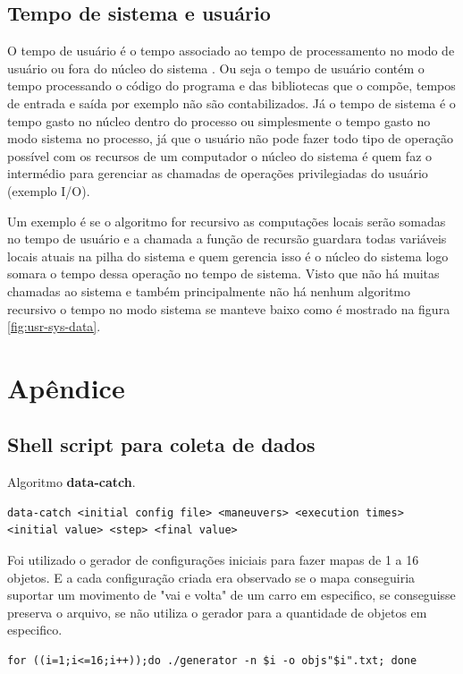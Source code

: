 \documentclass[11pt]{article}
\begin{document}
\subsection{Tempo de sistema e usuário}
\label{sec:orgffb0028}
O tempo de usuário é o tempo associado ao tempo de processamento no modo de usuário ou fora do núcleo do sistema \cite{kernel}. Ou seja o tempo de usuário contém o tempo processando o código do programa e das bibliotecas que o compõe, tempos de entrada e saída por exemplo não são contabilizados.
Já o tempo de sistema é o tempo gasto no núcleo dentro do processo ou simplesmente o tempo gasto no modo sistema no processo, já que o usuário não pode fazer todo tipo de operação possível com os recursos de um computador o núcleo do sistema é quem faz o intermédio para gerenciar as chamadas de operações privilegiadas do usuário (exemplo I/O).

Um exemplo é se o algoritmo for recursivo as computações locais serão somadas no tempo de usuário e a chamada a função de recursão guardara todas variáveis locais atuais na pilha do sistema e quem gerencia isso é o núcleo do sistema logo somara o tempo dessa operação no tempo de sistema. Visto que não há muitas chamadas ao sistema e também principalmente não há nenhum algoritmo recursivo o tempo no modo sistema se manteve baixo como é mostrado na figura \ref{fig:usr-sys-data}.

\section{Apêndice}
\label{sec:orgf0305e6}
\subsection{Shell script para coleta de dados}
\label{sec:org3c7ca7c}
Algoritmo \textbf{data-catch}.
\begin{lstlisting}
data-catch <initial config file> <maneuvers> <execution times> <initial value> <step> <final value>
\end{lstlisting}

Foi utilizado o gerador de configurações iniciais para fazer mapas de 1 a 16 objetos. E a cada configuração criada era observado se o mapa conseguiria suportar um movimento de "vai e volta" de um carro em especifico, se conseguisse preserva o arquivo, se não utiliza o gerador para a quantidade de objetos em especifico.

\begin{lstlisting}
for ((i=1;i<=16;i++));do ./generator -n $i -o objs"$i".txt; done
\end{lstlisting}
\end{document}

